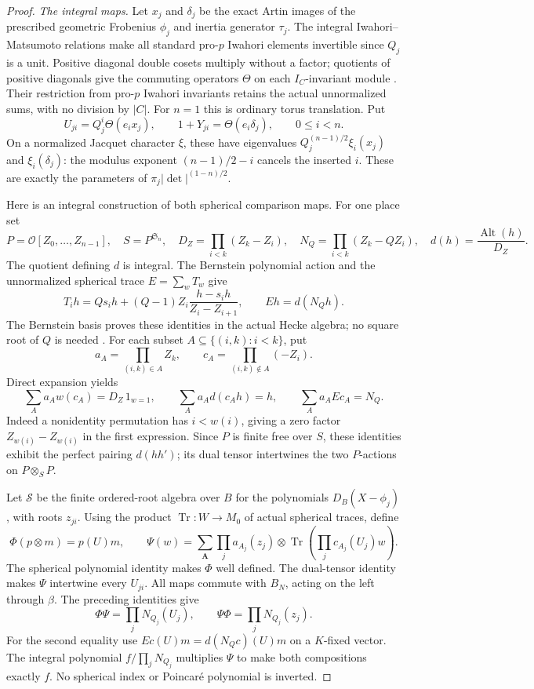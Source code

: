 \begin{proof}
\emph{The integral maps.}
Let \(x_j\) and \(\delta_j\) be the exact Artin images of the
prescribed geometric Frobenius \(\phi_j\) and inertia generator
\(\tau_j\).  The integral Iwahori--Matsumoto relations make all
standard pro-\(p\) Iwahori elements invertible since \(Q_j\) is a
unit.  Positive diagonal double cosets multiply without a factor;
quotients of positive diagonals give the commuting operators
\(\Theta\) on each \(I_C\)-invariant module
\cite[Theorem 1, Propositions 4 and 6]{SelmerTWVigneras}.
Their restriction from pro-\(p\) Iwahori invariants retains the
actual unnormalized sums, with no division by \(|C|\).
For \(n=1\) this is ordinary torus translation.  Put
\[
 U_{ji}=Q_j^i\Theta(e_ix_j),\qquad
 1+Y_{ji}=\Theta(e_i\delta_j),\qquad 0\le i<n.
\]
On a normalized Jacquet character \(\xi\), these have eigenvalues
\(Q_j^{(n-1)/2}\xi_i(x_j)\) and \(\xi_i(\delta_j)\):
the modulus exponent \((n-1)/2-i\) cancels the inserted \(i\).
These are exactly the parameters of
\(\pi_j|\det|^{(1-n)/2}\).

Here is an integral construction of both spherical comparison maps.
For one place set
\[
 P=\mathcal O[Z_0,\ldots,Z_{n-1}],\quad S=P^{\mathfrak S_n},
 \quad D_Z=\prod_{i<k}(Z_k-Z_i),\quad
 N_Q=\prod_{i<k}(Z_k-QZ_i),\quad
 d(h)=\frac{\operatorname{Alt}(h)}{D_Z}.
\]
The quotient defining \(d\) is integral.  The Bernstein polynomial
action and the unnormalized spherical trace \(E=\sum_wT_w\) give
\[
 T_i h=Q s_i h+(Q-1)Z_i\frac{h-s_i h}{Z_i-Z_{i+1}},
 \qquad Eh=d(N_Qh).
\]
The Bernstein basis proves these identities in the actual Hecke
algebra; no square root of \(Q\) is needed
\cite[\S\S1.6--1.7, 1.15 and 2.3]{SelmerTWHKP}.
For each subset \(A\subseteq\{(i,k):i<k\}\), put
\[
 a_A=\prod_{(i,k)\in A}Z_k,\qquad
 c_A=\prod_{(i,k)\notin A}(-Z_i).
\]
Direct expansion yields
\[
 \sum_Aa_Aw(c_A)=D_Z\,1_{w=1},\qquad
 \sum_Aa_Ad(c_Ah)=h,\qquad
 \sum_Aa_AEc_A=N_Q.
\]
Indeed a nonidentity permutation has \(i<w(i)\), giving a zero
factor \(Z_{w(i)}-Z_{w(i)}\) in the first expression.
Since \(P\) is finite free over \(S\), these identities exhibit the
perfect pairing \(d(hh')\); its dual tensor intertwines the two
\(P\)-actions on \(P\otimes_SP\).

Let \(\mathcal S\) be the finite ordered-root algebra over \(B\)
for the polynomials \(D_B(X-\phi_j)\), with roots \(z_{ji}\).
Using the product \(\operatorname{Tr}:W\to M_0\) of actual spherical
traces, define
\[
 \Phi(p\otimes m)=p(U)m,\qquad
 \Psi(w)=\sum_{\boldsymbol A}\prod_j a_{A_j}(z_j)\otimes
       \operatorname{Tr}\!\left(\prod_jc_{A_j}(U_j)w\right).
\]
The spherical polynomial identity makes \(\Phi\) well defined.
The dual-tensor identity makes \(\Psi\) intertwine every \(U_{ji}\).
All maps commute with \(B_N\), acting on the left through \(\beta\).
The preceding identities give
\[
 \Phi\Psi=\prod_jN_{Q_j}(U_j),\qquad
 \Psi\Phi=\prod_jN_{Q_j}(z_j).
\]
For the second equality use \(Ec(U)m=d(N_Qc)(U)m\) on a
\(K\)-fixed vector.  The integral polynomial
\(f/\prod_jN_{Q_j}\) multiplies \(\Psi\) to make both compositions
exactly \(f\).  No spherical index or Poincar\'e polynomial is
inverted.


\end{proof}
